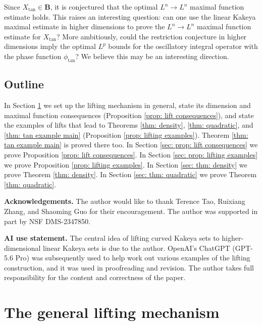 \documentclass[reqno,11pt]{amsart}
\numberwithin{equation}{section}
\numberwithin{figure}{section}
\theoremstyle{plain}
\theoremstyle{definition}
\begin{document}
    Since $X_{\tan} \in \mathbf B$, it is conjectured that the optimal $L^n \to L^n$ maximal function estimate holds. This raises an interesting question: can one use the linear Kakeya maximal estimate in higher dimensions to prove the $L^n \to L^n$ maximal function estimate for $X_{\tan}$? More ambitiously, could the restriction conjecture in higher dimensions imply the optimal $L^p$ bounds for the oscillatory integral operator with the phase function $\phi_{\tan}$? We believe this may be an interesting direction.


    \subsection{Outline}

    In Section \ref{sec: general lifting} we set up the lifting mechanism in general, state its dimension and maximal function consequences (Proposition \ref{prop: lift consequences}), and state the examples of lifts that lead to Theorems \ref{thm: density}, \ref{thm: quadratic}, and \ref{thm: tan example main} (Proposition \ref{prop: lifting examples}). Theorem \ref{thm: tan example main} is proved there too. 
    In Section \ref{sec: prop: lift consequences} we prove Proposition \ref{prop: lift consequences}. In Section \ref{sec: prop: lifting examples} we prove Proposition \ref{prop: lifting examples}. In Section \ref{sec: thm: density} we prove Theorem \ref{thm: density}. In Section \ref{sec: thm: quadratic} we prove Theorem \ref{thm: quadratic}. 

    \noindent \textbf{Acknowledgements.} 
    The author would like to thank Terence Tao, Ruixiang Zhang, and Shaoming Guo for their encouragement.
    The author was supported in part by NSF DMS-2347850. 

    

    \noindent \textbf{AI use statement.}
    The central idea of lifting curved Kakeya sets to higher-dimensional linear Kakeya sets is due to the author. OpenAI's ChatGPT (GPT-5.6 Pro) was subsequently used to help work out various examples of the lifting construction, and it was used in proofreading and revision.
    The author takes full responsibility for the content and correctness of the paper.
    

    
    


    \section{The general lifting mechanism}\label{sec: general lifting}
\end{document}
